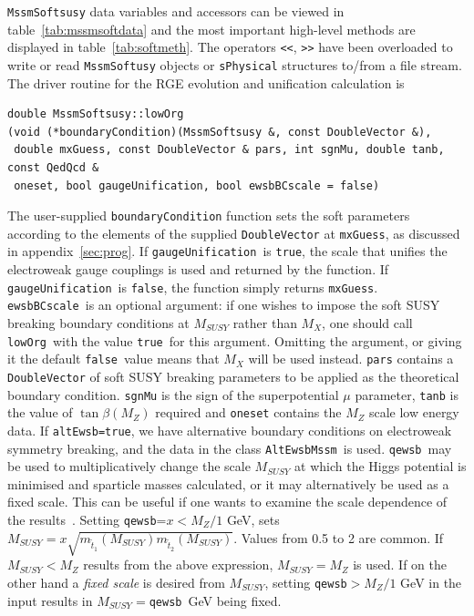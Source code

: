 \documentclass{article}
\def\code#1{\small{\tt #1}\normalsize}
\begin{document}
\code{MssmSoftsusy} data variables and accessors can be viewed in
table~\ref{tab:mssmsoftdata} and the most important high-level 
methods are displayed in table~\ref{tab:softmeth}.
The operators \code{<<}, \code{>>} have been overloaded to write or read 
\code{MssmSoftusy} objects or \code{sPhysical} structures to/from a file
stream. 
The driver routine for the RGE evolution and unification calculation is
\small
\begin{verbatim}
double MssmSoftsusy::lowOrg
(void (*boundaryCondition)(MssmSoftsusy &, const DoubleVector &),
 double mxGuess, const DoubleVector & pars, int sgnMu, double tanb, const QedQcd &
 oneset, bool gaugeUnification, bool ewsbBCscale = false)
\end{verbatim}
\normalsize
The user-supplied \code{boundaryCondition} function sets the soft parameters 
according to 
the elements of the supplied \code{DoubleVector} at \code{mxGuess}, 
as discussed in appendix~\ref{sec:prog}. If \code{gaugeUnification}~is
\code{true}, the scale that unifies the electroweak gauge couplings is used
and returned by the function. If \code{gaugeUnification}~is \code{false}, the
function simply returns \code{mxGuess}.
\code{ewsbBCscale}~is an optional argument: if one wishes to impose the soft
SUSY breaking boundary conditions at $M_{SUSY}$ rather than $M_X$, one should
call \code{lowOrg}~with the value \code{true}~for this argument. Omitting the
argument, or giving it the default \code{false}~value means that $M_X$ will be
used instead. 
\code{pars} contains a \code{DoubleVector}
of soft SUSY breaking parameters to be applied as the theoretical boundary
condition.  
\code{sgnMu} is the sign of the
superpotential $\mu$ parameter, \code{tanb} is the value of $\tan \beta (M_Z)$
required and \code{oneset} contains the $M_Z$ scale low energy data.
If \code{altEwsb=true}, we have alternative boundary conditions on electroweak
symmetry breaking, and the data in the class \code{AltEwsbMssm}~is used.
\code{qewsb}~may be used to multiplicatively change the scale $M_{SUSY}$ at which 
the Higgs potential is minimised and sparticle masses calculated, or it may
alternatively be used as a fixed scale.
This can be useful if one wants to examine
the scale dependence of the results~\cite{scaledep}. Setting
\code{qewsb}=$x<M_Z/1$ GeV,
sets $M_{SUSY} = x\sqrt{m_{\tilde t_1}(M_{SUSY}) m_{\tilde t_2}(M_{SUSY})}$. Values from
0.5 to 2 are common. If $M_{SUSY}<M_Z$ results from the above expression, $M_{SUSY}=M_Z$
is used. If on the other hand a {\em fixed scale}\/ is desired from $M_{SUSY}$, 
setting \code{qewsb}$>M_Z/1$ GeV in the input results in 
$M_{SUSY}=$\code{qewsb}~GeV being fixed.
\end{document}
